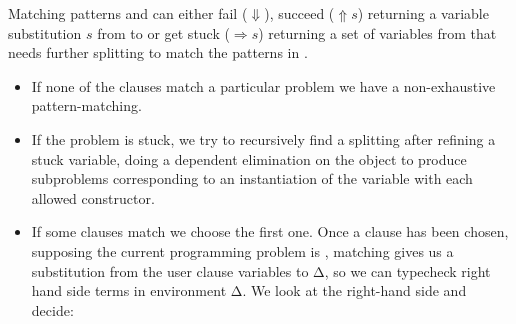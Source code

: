 Matching patterns  and  can either fail ($\Downarrow$),
succeed ($\Uparrow s$) returning a variable substitution $s$ from
 to  or get stuck ($\Rightarrow s$) returning a set of
variables from  that needs further splitting to match the
patterns in . 

\begin{itemize}
\item If none of the clauses match a particular problem
  we have a non-exhaustive pattern-matching. 

\item If the problem is stuck, we
  try to recursively find a splitting after refining a stuck variable,
  doing a dependent elimination on the object to produce subproblems
  corresponding to an instantiation of the variable with each allowed
  constructor.

\item If some clauses match we choose the first one. Once a clause has
  been chosen, supposing the
  current programming problem is , matching gives us a
  substitution from the user clause variables to Δ, so we can typecheck
  right hand side terms in environment Δ. We look at the right-hand side
  and decide:


\end{itemize}

